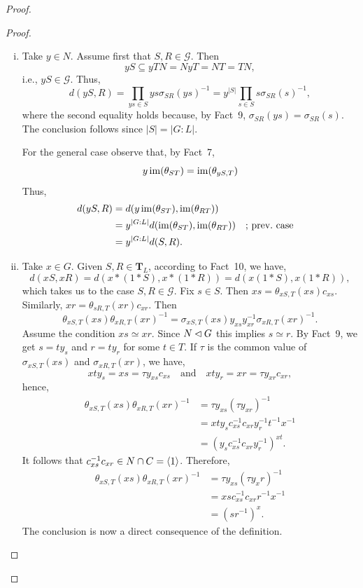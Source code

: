 \begin{proof}
\begin{proof}
\begin{enumerate}[a),font=\upshape]
{\begin{enumerate}[i)]
        \item Take $y\in N$. Assume first that $S,R\in\mathcal G$. Then
        $$
            yS \subseteq yTN = NyT= NT= TN,
        $$
        i.e., $yS\in\mathcal G$. Thus,
        $$
            d(yS,R)=\prod_{ys\in S} ys\sigma_{SR}(ys)^{-1}
                = y^{|S|}\prod_{s\in S}s\sigma_{SR}(s)^{-1},
        $$
        where the second equality holds because, by Fact~9, $\sigma_{SR}(ys)=\sigma_{SR}(s)$. The conclusion follows since $|S|=|G:L|$.

        For the general case observe that, by Fact~7,
        $$
            y\operatorname{im}(\theta_{ST})=\operatorname{im}(\theta_{yS,T})
        $$
        Thus,
        \begin{align*}
            d(yS,R) &= d(y\operatorname{im}(\theta_{ST}),\operatorname{im}(\theta_{RT}))\\
                &= y^{|G:L|}d(\operatorname{im}(\theta_{ST}),\operatorname{im}(\theta_{RT}))
                    &&\text{; prev.~case}\\
                &= y^{|G:L|}d(S,R).
        \end{align*}

        \item Take $x\in G$. Given $S,R\in\mathbf T_L$, according to Fact~10, we have,
        $$
            d(xS,xR) = d(x\ast(1\ast S),x\ast(1\ast R))
                = d(x(1\ast S),x(1\ast R)),
        $$
        which takes us to the case $S,R\in\mathcal G$. Fix $s\in S$. Then $xs=\theta_{xS,T}(xs)c_{xs}$. Similarly, $xr=\theta_{sR,T}(xr)c_{xr}$. Then
        $$
            \theta_{xS,T}(xs)\theta_{xR,T}(xr)^{-1}
                = \sigma_{xS,T}(xs)y_{xs}y_{xr}^{-1}\sigma_{xR,T}(xr)^{-1}.
        $$
        Assume the condition\/ $xs\simeq xr$. Since $N\lhd G$ this implies $s\simeq r$. By Fact~9, we get $s=ty_s$ and $r=ty_r$ for some $t\in T$. If $\tau$ is the common value of $\sigma_{xS,T}(xs)$ and $\sigma_{xR,T}(xr)$, we have,
        $$
            xty_s= xs =\tau y_{xs}c_{xs}\quad\text{and}
                \quad xty_r = xr = \tau y_{xr}c_{xr},
        $$
        hence,
        \begin{align*}
            \theta_{xS,T}(xs)\theta_{xR,T}(xr)^{-1}
                &=\tau y_{xs}(\tau y_{xr})^{-1}\\
                &= xty_sc_{xs}^{-1}c_{xr}y_r^{-1}t^{-1}x^{-1}\\
                &= (y_sc_{xs}^{-1}c_{xr}y_r^{-1})^{xt}.
        \end{align*}
        It follows that $c_{xs}^{-1}c_{xr}\in N\cap C=\langle1\rangle$. Therefore,
        \begin{align*}
            \theta_{xS,T}(xs)\theta_{xR,T}(xr)^{-1}
                &=\tau y_{xs}(\tau y_xr)^{-1}\\
                &= xsc_{xs}^{-1}c_{xr}r^{-1}x^{-1}\\
                &= (sr^{-1})^x.
        \end{align*}
        The conclusion is now a direct consequence of the definition.
        

\end{enumerate}}
\end{enumerate}
\end{proof}
\end{proof}
